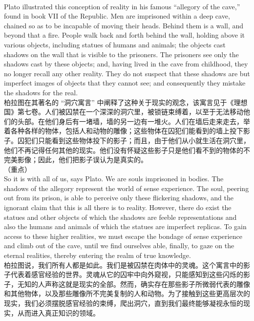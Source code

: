 \documentclass{article}
\begin{document}
\\
Plato illustrated this conception of reality in his famous “allegory of the cave,” found in book VII of the Republic. Men are imprisoned within a deep cave, chained so as to be incapable of moving their heads. Behind them is a wall, and beyond that a fire. People walk back and forth behind the wall, holding above it various objects, including statues of humans and animals; the objects cast shadows on the wall that is visible to the prisoners. The prisoners see only the shadows cast by these objects; and, having lived in the cave from childhood, they no longer recall any other reality. They do not suspect that these shadows are but imperfect images of objects that they cannot see; and consequently they mistake the shadows for the real.\\
柏拉图在其著名的 “洞穴寓言” 中阐释了这种关于现实的观念，该寓言见于《理想国》第七卷。人们被囚禁在一个深深的洞穴里，被锁链束缚着，以至于无法移动他们的头部。在他们身后有一堵墙，墙的另一边有一堆火。人们在墙后走来走去，举着各种各样的物体，包括人和动物的雕像；这些物体在囚犯们能看到的墙上投下影子。囚犯们只能看到这些物体投下的影子；而且，由于他们从小就生活在洞穴里，他们不再记得任何其他的现实。他们没有怀疑这些影子只是他们看不到的物体的不完美影像；因此，他们把影子误认为是真实的。\\

（重点）\\
So it is with all of us, says Plato. We are souls imprisoned in bodies. The shadows of the allegory represent the world of sense experience. The soul, peering out from its prison, is able to perceive only these flickering shadows, and the ignorant claim that this is all there is to reality. However, there do exist the statues and other objects of which the shadows are feeble representations and also the humans and animals of which the statues are imperfect replicas. To gain access to these higher realities, we must escape the bondage of sense experience and climb out of the cave, until we find ourselves able, finally, to gaze on the eternal realities, thereby entering the realm of true knowledge.\\
柏拉图说，我们所有人都是如此。我们是被囚禁在肉体中的灵魂。这个寓言中的影子代表着感官经验的世界。灵魂从它的囚牢中向外窥视，只能感知到这些闪烁的影子，无知的人声称这就是现实的全部。然而，确实存在那些影子所微弱代表的雕像和其他物体，以及那些雕像所不完美复制的人和动物。为了接触到这些更高层次的现实，我们必须摆脱感官经验的束缚，爬出洞穴，直到我们最终能够凝视永恒的现实，从而进入真正知识的领域。\\
\end{document}
